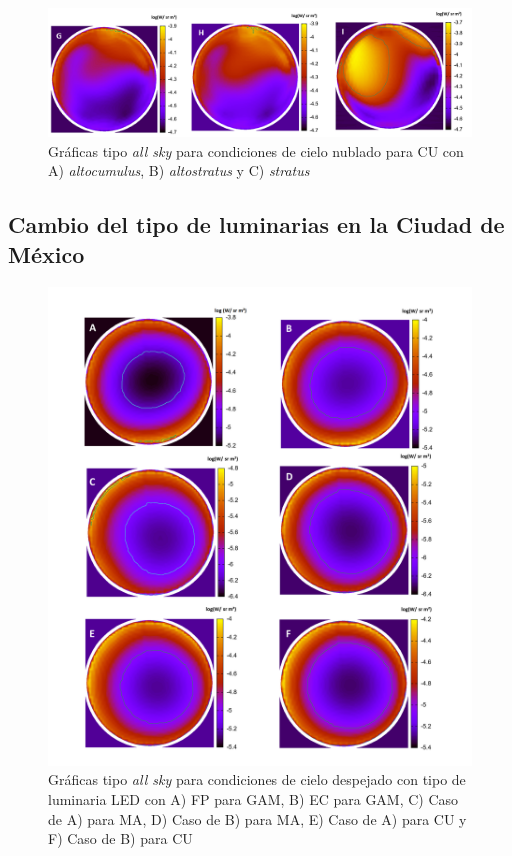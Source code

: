 \begin{figure}[H]
  \centering
    \includegraphics[width=1\textwidth]{7}
  \caption{Gráficas tipo \textit{all sky} para condiciones de cielo nublado para CU con A) \textit{altocumulus}, B) \textit{altostratus} y C) \textit{stratus}} 
  \label{7}
\end{figure}

\newpage

\subsection{Cambio del tipo de luminarias en la Ciudad de México}

\begin{figure}[H]
  \centering
    \includegraphics[width=1\textwidth]{8}
  \caption{Gráficas tipo \textit{all sky} para condiciones de cielo despejado con tipo de luminaria LED con A) FP para GAM, B) EC para GAM, C) Caso de A) para MA, D) Caso de B) para MA, E) Caso de A) para CU y F) Caso de B) para CU} 
  \label{8}
\end{figure}

